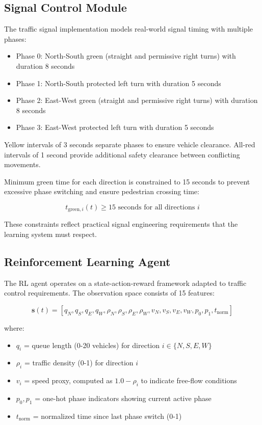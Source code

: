 \documentclass[10pt,conference]{IEEEtran}
\begin{document}
\subsection{Signal Control Module}

The traffic signal implementation models real-world signal timing with multiple phases:

\begin{itemize}
    \item Phase 0: North-South green (straight and permissive right turns) with duration 8 seconds
    \item Phase 1: North-South protected left turn with duration 5 seconds
    \item Phase 2: East-West green (straight and permissive right turns) with duration 8 seconds
    \item Phase 3: East-West protected left turn with duration 5 seconds
\end{itemize}

Yellow intervals of 3 seconds separate phases to ensure vehicle clearance. All-red intervals of 1 second provide additional safety clearance between conflicting movements.

Minimum green time for each direction is constrained to 15 seconds to prevent excessive phase switching and ensure pedestrian crossing time:

\begin{equation}
t_{\text{green},i}(t) \geq 15 \text{ seconds for all directions } i
\end{equation}

These constraints reflect practical signal engineering requirements that the learning system must respect.

\subsection{Reinforcement Learning Agent}

The RL agent operates on a state-action-reward framework adapted to traffic control requirements. The observation space consists of 15 features:

\begin{equation}
\mathbf{s}(t) = [q_N, q_S, q_E, q_W, \rho_N, \rho_S, \rho_E, \rho_W, v_N, v_S, v_E, v_W, p_0, p_1, t_{\text{norm}}]
\end{equation}

where:
\begin{itemize}
    \item $q_i$ = queue length (0-20 vehicles) for direction $i \in \{N,S,E,W\}$
    \item $\rho_i$ = traffic density (0-1) for direction $i$
    \item $v_i$ = speed proxy, computed as $1.0 - \rho_i$ to indicate free-flow conditions
    \item $p_0, p_1$ = one-hot phase indicators showing current active phase
    \item $t_{\text{norm}}$ = normalized time since last phase switch (0-1)
\end{itemize}
\end{document}
